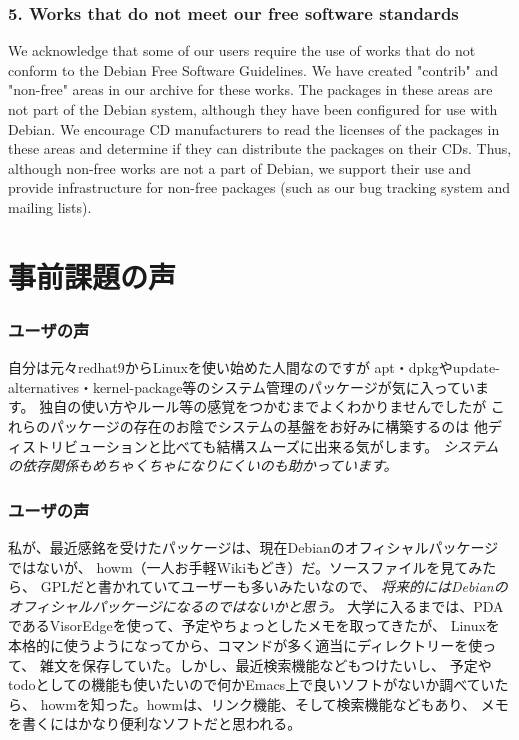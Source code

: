 \documentclass[cjk,dvipdfmx]{beamer}
\begin{document}
\begin{frame}
\frametitle{5. Works that do not meet our free software standards} 
    
       We acknowledge that some of our users require the use of works
       that do not conform to the Debian Free Software Guidelines. We
       have created "contrib" and "non-free" areas in our archive for
       these works. The packages in these areas are not part of the
       Debian system, although they have been configured for use with
       Debian. We encourage CD manufacturers to read the licenses of the
       packages in these areas and determine if they can distribute the
       packages on their CDs. Thus, although non-free works are not a
       part of Debian, we support their use and provide infrastructure
       for non-free packages (such as our bug tracking system and mailing
       lists).
\end{frame}


\section{事前課題の声}

\begin{frame}
 \frametitle{ユーザの声}
自分は元々redhat9からLinuxを使い始めた人間なのですが
apt・dpkgやupdate-alternatives・kernel-package等のシステム管理のパッケージが気に入っています。
独自の使い方やルール等の感覚をつかむまでよくわかりませんでしたが
これらのパッケージの存在のお陰でシステムの基盤をお好みに構築するのは
他ディストリビューションと比べても結構スムーズに出来る気がします。
{\em システムの依存関係もめちゃくちゃになりにくいのも助かっています。}
\end{frame}

\begin{frame}
 \frametitle{ユーザの声}
私が、最近感銘を受けたパッケージは、現在Debianのオフィシャルパッケージではないが、
howm（一人お手軽Wikiもどき）だ。ソースファイルを見てみたら、
GPLだと書かれていてユーザーも多いみたいなので、
{\em 将来的にはDebianのオフィシャルパッケージになるのではないかと思う。}
大学に入るまでは、PDAであるVisorEdgeを使って、予定やちょっとしたメモを取ってきたが、
Linuxを本格的に使うようになってから、コマンドが多く適当にディレクトリーを使って、
雑文を保存していた。しかし、最近検索機能などもつけたいし、
予定やtodoとしての機能も使いたいので何かEmacs上で良いソフトがないか調べていたら、
howmを知った。howmは、リンク機能、そして検索機能などもあり、
メモを書くにはかなり便利なソフトだと思われる。
\end{frame}
\end{document}
